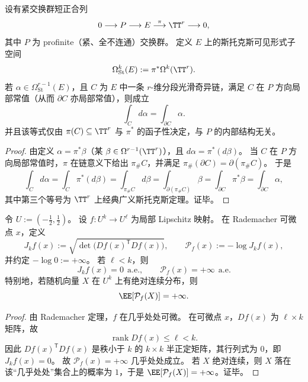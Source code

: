 \begin{theorem}\label{thm:conclusion-profinite-fiber-stokes-invisibility}
设有紧交换群短正合列
\[
0\longrightarrow P\longrightarrow E\stackrel{\pi}{\longrightarrow}\TT^r\longrightarrow 0,
\]
其中 \(P\) 为 profinite（紧、全不连通）交换群。
定义 \(E\) 上的斯托克斯可见形式子空间
\[
\Omega^k_{\mathrm{St}}(E):=\pi^\ast\Omega^k(\TT^r).
\]
若 \(\alpha\in\Omega^{r-1}_{\mathrm{St}}(E)\)，且 \(C\) 为 \(E\) 中一条 \(r\)-维分段光滑奇异链，满足 \(C\) 在 \(P\) 方向局部常值（从而 \(\partial C\) 亦局部常值），则成立
\[
\int_C d\alpha=\int_{\partial C}\alpha.
\]
并且该等式仅由 \(\pi(C)\subseteq\TT^r\) 与 \(\pi^\ast\) 的函子性决定，与 \(P\) 的内部结构无关。
\end{theorem}

\begin{proof}
由定义 \(\alpha=\pi^\ast\beta\)（某 \(\beta\in\Omega^{r-1}(\TT^r)\)），且 \(d\alpha=\pi^\ast(d\beta)\)。
当 \(C\) 在 \(P\) 方向局部常值时，\(\pi\) 在链意义下给出 \(\pi_\# C\)，并满足 \(\pi_\#(\partial C)=\partial(\pi_\# C)\)。
于是
\[
\int_C d\alpha
=\int_C \pi^\ast(d\beta)
=\int_{\pi_\# C} d\beta
=\int_{\partial(\pi_\# C)}\beta
=\int_{\partial C}\pi^\ast\beta
=\int_{\partial C}\alpha,
\]
其中第三个等号为 \(\TT^r\) 上经典广义斯托克斯定理。证毕。
\end{proof}

\begin{theorem}[有限精度势约束下的圆维单调性]\label{thm:conclusion-jacobian-potential-dimension-monotonicity}
令 \(U:=(-\tfrac12,\tfrac12)\)。
设 \(f:U^k\to U^\ell\) 为局部 Lipschitz 映射。
在 Rademacher 可微点 \(x\)，定义
\[
J_k f(x):=\sqrt{\det\!\bigl(Df(x)^{\mathsf T}Df(x)\bigr)},
\qquad
\mathcal P_f(x):=-\log J_k f(x),
\]
并约定 \(-\log 0:=+\infty\)。
若 \(\ell<k\)，则
\[
J_k f(x)=0\ \ \text{a.e.},\qquad
\mathcal P_f(x)=+\infty\ \ \text{a.e.}
\]
特别地，若随机向量 \(X\) 在 \(U^k\) 上有绝对连续分布，则
\[
\EE[\mathcal P_f(X)]=+\infty.
\]
\end{theorem}
\begin{proof}
由 Rademacher 定理，\(f\) 在几乎处处可微。
在可微点 \(x\)，\(Df(x)\) 为 \(\ell\times k\) 矩阵，故
\[
\operatorname{rank}Df(x)\le \ell<k.
\]
因此 \(Df(x)^{\mathsf T}Df(x)\) 是秩小于 \(k\) 的 \(k\times k\) 半正定矩阵，其行列式为 \(0\)，即 \(J_k f(x)=0\)。
故 \(\mathcal P_f(x)=+\infty\) 几乎处处成立。
若 \(X\) 绝对连续，则 \(X\) 落在该“几乎处处”集合上的概率为 \(1\)，于是 \(\EE[\mathcal P_f(X)]=+\infty\)。证毕。
\end{proof}

